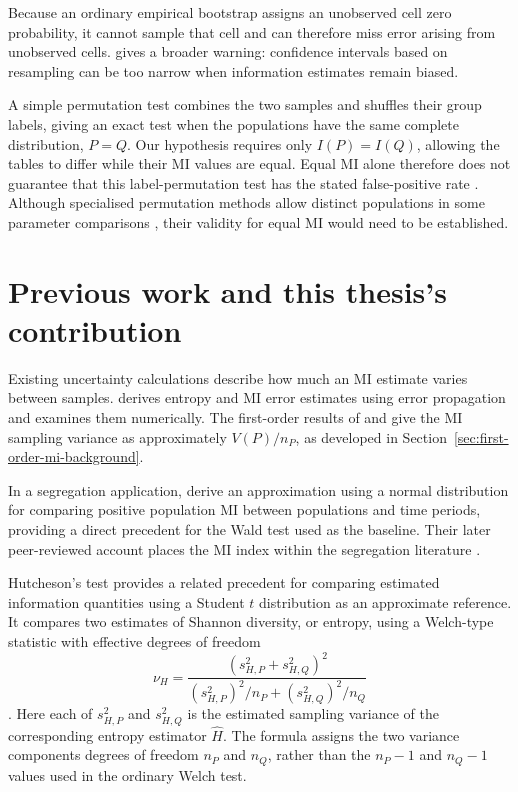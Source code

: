 Because an ordinary empirical bootstrap assigns an unobserved cell zero
probability, it cannot sample that cell and can therefore miss error
arising from unobserved cells. \citet{paninski2003} gives a broader warning: confidence
intervals based on resampling can be too narrow when information estimates
remain biased.

A simple permutation test combines the two samples and shuffles their
group labels, giving an exact test when the populations have the same
complete distribution, \(P=Q\). Our hypothesis requires only
\(I(P)=I(Q)\), allowing the tables to differ while their MI values are
equal. Equal MI alone therefore does not guarantee that this label-permutation test
has the stated false-positive rate \citep{chung2013}.
Although specialised permutation methods allow distinct populations in
some parameter comparisons \citep{janssen1997,chung2013}, their validity
for equal MI would need to be established.

\section{Previous work and this thesis's contribution}

Existing uncertainty calculations describe how much an MI estimate varies
between samples. \citet{roulston1999} derives entropy and MI error estimates
using error propagation and examines them numerically. The first-order
results of \citet{moddemeijer1989} and \citet{brillinger2004} give the MI
sampling variance as approximately \(V(P)/n_P\), as developed in
Section~\ref{sec:first-order-mi-background}.

In a segregation application, \citet{mora2009} derive an approximation using
a normal distribution for comparing positive population MI between
populations and time periods, providing a direct precedent for the Wald
test used as the baseline. Their later
peer-reviewed account places the MI index within the segregation literature
\citep{mora2011}.

Hutcheson's test provides a related precedent for comparing estimated
information quantities using a Student \(t\) distribution as an approximate
reference. It compares two estimates of Shannon diversity, or entropy,
using a Welch-type statistic with effective degrees of freedom
\begin{equation}
  \nu_H=
  \frac{(s_{H,P}^2+s_{H,Q}^2)^2}
       {(s_{H,P}^2)^2/n_P+(s_{H,Q}^2)^2/n_Q}
  \label{eq:hutcheson-df}
\end{equation}
\citep{hutcheson1970}. Here each of
\(s_{H,P}^2\) and \(s_{H,Q}^2\) is the estimated sampling variance of the
corresponding entropy estimator \(\widehat H\). The formula assigns the
two variance components degrees of freedom \(n_P\) and \(n_Q\), rather
than the \(n_P-1\) and \(n_Q-1\) values used in the ordinary Welch test.

